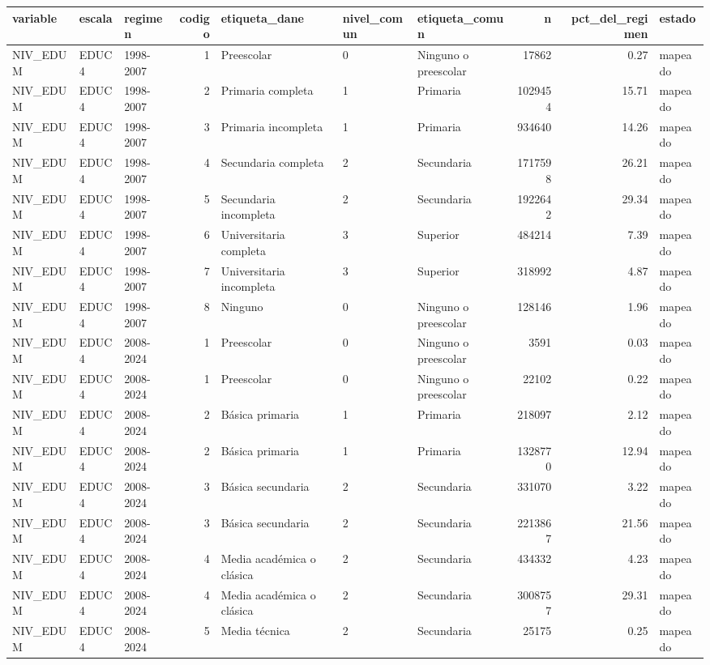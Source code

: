 \begin{tabular}{lllrlllrrl}
\toprule
variable & escala & regimen & codigo & etiqueta\_dane & nivel\_comun & etiqueta\_comun & n & pct\_del\_regimen & estado \\
\midrule
NIV\_EDUM & EDUC4 & 1998-2007 & 1 & Preescolar & 0 & Ninguno o preescolar & 17862 & 0.27 & mapeado \\
NIV\_EDUM & EDUC4 & 1998-2007 & 2 & Primaria completa & 1 & Primaria & 1029454 & 15.71 & mapeado \\
NIV\_EDUM & EDUC4 & 1998-2007 & 3 & Primaria incompleta & 1 & Primaria & 934640 & 14.26 & mapeado \\
NIV\_EDUM & EDUC4 & 1998-2007 & 4 & Secundaria completa & 2 & Secundaria & 1717598 & 26.21 & mapeado \\
NIV\_EDUM & EDUC4 & 1998-2007 & 5 & Secundaria incompleta & 2 & Secundaria & 1922642 & 29.34 & mapeado \\
NIV\_EDUM & EDUC4 & 1998-2007 & 6 & Universitaria completa & 3 & Superior & 484214 & 7.39 & mapeado \\
NIV\_EDUM & EDUC4 & 1998-2007 & 7 & Universitaria incompleta & 3 & Superior & 318992 & 4.87 & mapeado \\
NIV\_EDUM & EDUC4 & 1998-2007 & 8 & Ninguno & 0 & Ninguno o preescolar & 128146 & 1.96 & mapeado \\
NIV\_EDUM & EDUC4 & 2008-2024 & 1 & Preescolar & 0 & Ninguno o preescolar & 3591 & 0.03 & mapeado \\
NIV\_EDUM & EDUC4 & 2008-2024 & 1 & Preescolar & 0 & Ninguno o preescolar & 22102 & 0.22 & mapeado \\
NIV\_EDUM & EDUC4 & 2008-2024 & 2 & Básica primaria & 1 & Primaria & 218097 & 2.12 & mapeado \\
NIV\_EDUM & EDUC4 & 2008-2024 & 2 & Básica primaria & 1 & Primaria & 1328770 & 12.94 & mapeado \\
NIV\_EDUM & EDUC4 & 2008-2024 & 3 & Básica secundaria & 2 & Secundaria & 331070 & 3.22 & mapeado \\
NIV\_EDUM & EDUC4 & 2008-2024 & 3 & Básica secundaria & 2 & Secundaria & 2213867 & 21.56 & mapeado \\
NIV\_EDUM & EDUC4 & 2008-2024 & 4 & Media académica o clásica & 2 & Secundaria & 434332 & 4.23 & mapeado \\
NIV\_EDUM & EDUC4 & 2008-2024 & 4 & Media académica o clásica & 2 & Secundaria & 3008757 & 29.31 & mapeado \\
NIV\_EDUM & EDUC4 & 2008-2024 & 5 & Media técnica & 2 & Secundaria & 25175 & 0.25 & mapeado \\

\end{tabular}
